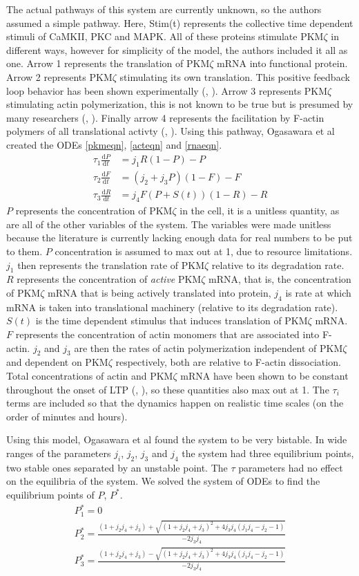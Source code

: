 \documentclass[12pt, a4paper]{article}
\renewcommand{\d}{\textrm{d}}
\newcommand{\PK}{PKM$\zeta$ }
\newcommand{\pk}{\PK}
\newcommand{\citeapa}[1]{(\citeauthor{#1}, \citeyear{#1})}
\begin{document}
The actual pathways of this system are currently unknown, so the authors assumed a simple pathway. Here, Stim(t) represents the collective time dependent stimuli of CaMKII, PKC and MAPK. All of these proteins stimulate \PK in different ways, however for simplicity of the model, the authors included it all as one. Arrow 1 represents the translation of \PK mRNA into functional protein. Arrow 2 represents \PK stimulating its own translation. This positive feedback loop behavior has been shown experimentally \citeapa{pkmZeta}. Arrow 3 represents \pk stimulating actin polymerization, this is not known to be true but is presumed by many researchers \citeapa{pkmZeta}. Finally arrow 4 represents the facilitation by F-actin polymers of all translational activty \citeapa{pkmZeta}. Using this pathway, Ogasawara et al created the ODEs \ref{pkmeqn}, \ref{acteqn} and \ref{rnaeqn}.
\begin{align}
\tau_1\frac{\d P}{\d t} &= j_1R(1-P)-P \label{pkmeqn} \\
\tau_2\frac{\d F}{\d t} &= (j_2 + j_3P)(1-F)-F \label{acteqn}\\
\tau_3\frac{\d R}{\d t} &= j_4F(P+S(t))(1-R) \label{rnaeqn} -R
\end{align}
$P$ represents the concentration of \pk in the cell, it is a unitless quantity, as are all of the other variables of the system. The variables were made unitless because the literature is currently lacking enough data for real numbers to be put to them. $P$ concentration is assumed to max out at 1, due to resource limitations. $j_1$ then represents the translation rate of \pk relative to its degradation rate. $R$ represents the concentration of \emph{active} \pk mRNA, that is, the concentration of \pk mRNA that is being actively translated into protein, $j_4$ is rate at which mRNA is taken into translational machinery (relative to its degradation rate). $S(t)$ is the time dependent stimulus that induces translation of \pk mRNA. $F$ represents the concentration of actin monomers that are associated into F-actin. $j_2$ and $j_3$ are then the rates of actin polymerization independent of \pk and dependent on \pk respectively, both are relative to F-actin dissociation. Total concentrations of actin and \pk mRNA have been shown to be constant throughout the onset of LTP \citeapa{pkmZeta}, so these quantities also max out at 1. The $\tau_i$ terms are included so that the dynamics happen on realistic time scales (on the order of minutes and hours).

Using this model, Ogasawara et al found the system to be very bistable. In wide ranges of the parameters $j_i$, $j_2$, $j_3$ and $j_4$ the system had three equilibrium points, two stable ones separated by an unstable point. The $\tau$ parameters had no effect on the equilibria of the system. We solved the system of ODEs to find the equilibrium points of $P$, $P^*$. 
\begin{gather*}
    P_1^* = 0\\
    P^*_2 = \frac{(1 + j_2j_4 + j_3) + \sqrt{(1+j_2j_4 + j_3)^2 + 4j_3j_4(j_1j_4-j_2-1)}}{-2j_3j_4}\\
    P^*_3 =\frac{(1 + j_2j_4 + j_3) - \sqrt{(1+j_2j_4 + j_3)^2 + 4j_3j_4(j_1j_4-j_2-1)}}{-2j_3j_4}
\end{gather*}
\end{document}
